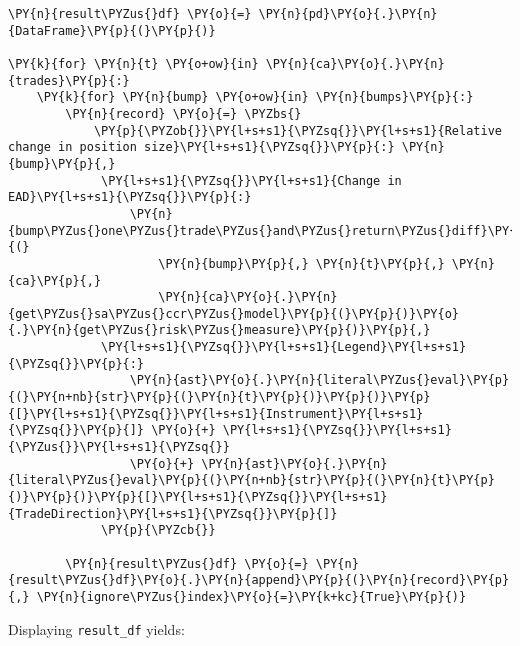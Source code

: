     \begin{tcolorbox}[breakable, size=fbox, boxrule=1pt, pad at break*=1mm,colback=cellbackground, colframe=cellborder]
\begin{Verbatim}[commandchars=\\\{\}]
\PY{n}{result\PYZus{}df} \PY{o}{=} \PY{n}{pd}\PY{o}{.}\PY{n}{DataFrame}\PY{p}{(}\PY{p}{)}

\PY{k}{for} \PY{n}{t} \PY{o+ow}{in} \PY{n}{ca}\PY{o}{.}\PY{n}{trades}\PY{p}{:}
    \PY{k}{for} \PY{n}{bump} \PY{o+ow}{in} \PY{n}{bumps}\PY{p}{:}
        \PY{n}{record} \PY{o}{=} \PYZbs{}
            \PY{p}{\PYZob{}}\PY{l+s+s1}{\PYZsq{}}\PY{l+s+s1}{Relative change in position size}\PY{l+s+s1}{\PYZsq{}}\PY{p}{:} \PY{n}{bump}\PY{p}{,}
             \PY{l+s+s1}{\PYZsq{}}\PY{l+s+s1}{Change in EAD}\PY{l+s+s1}{\PYZsq{}}\PY{p}{:}
                 \PY{n}{bump\PYZus{}one\PYZus{}trade\PYZus{}and\PYZus{}return\PYZus{}diff}\PY{p}{(}
                     \PY{n}{bump}\PY{p}{,} \PY{n}{t}\PY{p}{,} \PY{n}{ca}\PY{p}{,}
                     \PY{n}{ca}\PY{o}{.}\PY{n}{get\PYZus{}sa\PYZus{}ccr\PYZus{}model}\PY{p}{(}\PY{p}{)}\PY{o}{.}\PY{n}{get\PYZus{}risk\PYZus{}measure}\PY{p}{)}\PY{p}{,}
             \PY{l+s+s1}{\PYZsq{}}\PY{l+s+s1}{Legend}\PY{l+s+s1}{\PYZsq{}}\PY{p}{:}
                 \PY{n}{ast}\PY{o}{.}\PY{n}{literal\PYZus{}eval}\PY{p}{(}\PY{n+nb}{str}\PY{p}{(}\PY{n}{t}\PY{p}{)}\PY{p}{)}\PY{p}{[}\PY{l+s+s1}{\PYZsq{}}\PY{l+s+s1}{Instrument}\PY{l+s+s1}{\PYZsq{}}\PY{p}{]} \PY{o}{+} \PY{l+s+s1}{\PYZsq{}}\PY{l+s+s1}{\PYZus{}}\PY{l+s+s1}{\PYZsq{}}
                 \PY{o}{+} \PY{n}{ast}\PY{o}{.}\PY{n}{literal\PYZus{}eval}\PY{p}{(}\PY{n+nb}{str}\PY{p}{(}\PY{n}{t}\PY{p}{)}\PY{p}{)}\PY{p}{[}\PY{l+s+s1}{\PYZsq{}}\PY{l+s+s1}{TradeDirection}\PY{l+s+s1}{\PYZsq{}}\PY{p}{]}
             \PY{p}{\PYZcb{}}

        \PY{n}{result\PYZus{}df} \PY{o}{=} \PY{n}{result\PYZus{}df}\PY{o}{.}\PY{n}{append}\PY{p}{(}\PY{n}{record}\PY{p}{,} \PY{n}{ignore\PYZus{}index}\PY{o}{=}\PY{k+kc}{True}\PY{p}{)}
\end{Verbatim}
\end{tcolorbox}

    Displaying \texttt{result\_df} yields:
 
            
            \begin{tcolorbox}[breakable, size=fbox, boxrule=.5pt, pad at break*=1mm, opacityfill=0]
    \begin{center}
    \end{center}
    { \hspace*{\fill} \\}
\end{tcolorbox}
    

